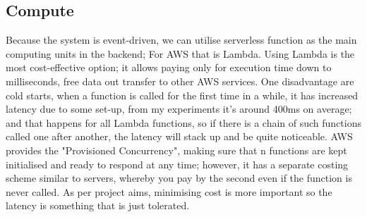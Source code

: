 \subsection{Compute}
Because the system is event-driven, we can utilise serverless function as the main computing units in the backend; For AWS that is Lambda. Using Lambda is the most cost-effective option; it allows paying only for execution time down to milliseconds, free data out transfer to other AWS services. One disadvantage are cold starts, when a function is called for the first time in a while, it has increased latency due to some set-up, from my experiments it's around 400ms on average; and that happens for all Lambda functions, so if there is a chain of such functions called one after another, the latency will stack up and be quite noticeable. AWS provides the "Provisioned Concurrency", making sure that n functions are kept initialised and ready to respond at any time; however, it has a separate costing scheme similar to servers, whereby you pay by the second even if the function is never called. As per project aims, minimising cost is more important so the latency is something that is just tolerated.
